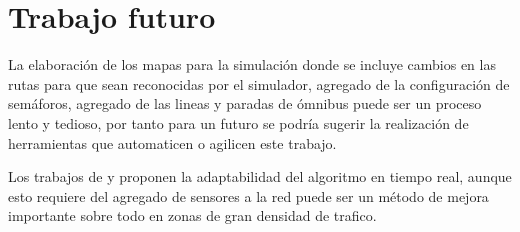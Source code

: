 \section{Trabajo futuro}

La elaboración de los mapas para la simulación donde se incluye cambios en las rutas para que sean reconocidas por el simulador, agregado de la configuración de semáforos, agregado de las lineas y paradas de ómnibus puede ser un proceso lento y tedioso, por tanto para un futuro se podría sugerir la realización de herramientas que automaticen o agilicen este trabajo.

Los trabajos de  \citet{Montana1996} y \citet{Vogel2000}  proponen la adaptabilidad del algoritmo en tiempo real, aunque esto requiere del agregado de sensores a la red puede ser un método de mejora importante sobre todo en zonas de gran densidad de trafico.
